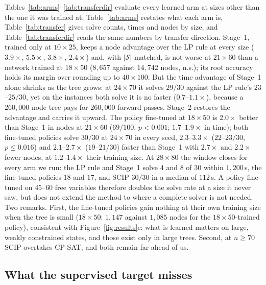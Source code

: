 \documentclass[final,5p,times,twocolumn]{elsarticle}
\newcommand{\SOL}{\mathcal{S}}
\begin{document}
Tables~\ref{tab:arms}--\ref{tab:transferdir} evaluate every learned arm at sizes other than the one it was trained at; Table~\ref{tab:arms} restates what each arm is, Table~\ref{tab:transfer} gives solve counts, times and nodes by size, and Table~\ref{tab:transferdir} reads the same numbers by transfer direction. Stage~1, trained only at $10\times25$, keeps a node advantage over the LP rule at every size ($3.9\times$, $5.5\times$, $3.8\times$, $2.4\times$) and, with $|\SOL|$ matched, is not worse at $21\times60$ than a network trained at $18\times50$ ($8{,}657$ against $14{,}742$ nodes, n.s.); its root accuracy holds its margin over rounding up to $40\times100$. But the time advantage of Stage~1 alone shrinks as the tree grows: at $24\times70$ it solves $29/30$ against the LP rule's $23$--$25/30$, yet on the instances both solve it is no faster ($0.7$--$1.1\times$), because a $260{,}000$-node tree pays for $260{,}000$ forward passes. Stage~2 restores the advantage and carries it upward. The policy fine-tuned at $18\times50$ is $2.0\times$ better than Stage~1 in nodes at $21\times60$ ($69/100$, $p<0.001$; $1.7$--$1.9\times$ in time); both fine-tuned policies solve $30/30$ at $24\times70$ in every seed, $2.3$--$3.3\times$ ($22$--$23/30$, $p\le0.016$) and $2.1$--$2.7\times$ ($19$--$21/30$) faster than Stage~1 with $2.7\times$ and $2.2\times$ fewer nodes, at $1.2$--$1.4\times$ their training size. At $28\times80$ the window closes for every arm we run: the LP rule and Stage~1 solve $4$ and $8$ of $30$ within $1{,}200$\,s, the fine-tuned policies $18$ and $17$, and SCIP $30/30$ in a median of $112$\,s. A policy fine-tuned on $45$--$60$ free variables therefore doubles the solve rate at a size it never saw, but does not extend the method to where a complete solver is not needed. Two remarks. First, the fine-tuned policies gain nothing at their own training size when the tree is small ($18\times50$: $1{,}147$ against $1{,}085$ nodes for the $18\times50$-trained policy), consistent with Figure~\ref{fig:results}c: what is learned matters on large, weakly constrained states, and those exist only in large trees. Second, at $n\ge70$ SCIP overtakes CP-SAT, and both remain far ahead of us.

\subsection{What the supervised target misses}
\label{sec:exp-residual}
\end{document}
